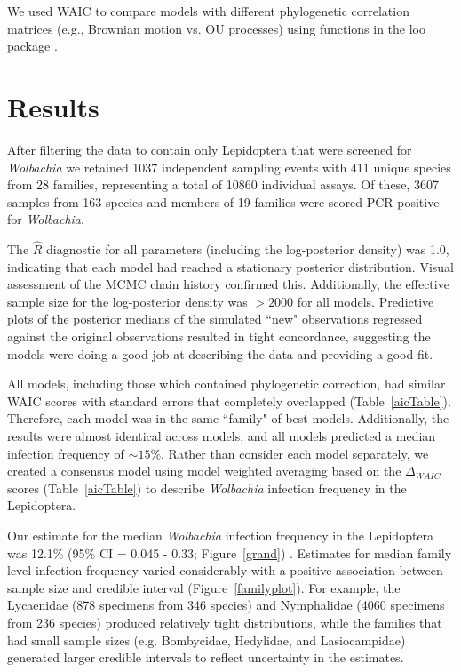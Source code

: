 \documentclass{frontiersSCNS}
\begin{document}
We used WAIC \citep[the widely applicable or Watanabe-Akaike information criterion;][]{Watanabe:2010aa,Gelman:2014aa} to compare models with different phylogenetic correlation matrices (e.g., Brownian motion vs. OU processes) using functions in the loo package \citep{Vehtari:2016aa}. 

\section{Results}
After filtering the \citet{Weinert:2015aa} data to contain only Lepidoptera that were screened for \textit{Wolbachia} we retained 1037 independent sampling events with 411 unique species from 28 families, representing a total of 10860 individual assays. Of these, 3607 samples from 163 species and members of 19 families were scored PCR positive for \textit{Wolbachia}. 

The $\hat{R}$ diagnostic for all parameters (including the log-posterior density) was 1.0, indicating that each model had reached a stationary posterior distribution. Visual assessment of the MCMC chain history confirmed this. Additionally, the effective sample size for the log-posterior density was $> 2000$ for all models. Predictive plots of the posterior medians of the simulated ``new" observations regressed against the original observations resulted in tight concordance, suggesting the models were doing a good job at describing the data and providing a good fit. %

All models, including those which contained phylogenetic correction, had similar WAIC scores with standard errors that completely overlapped (Table~\ref{aicTable}).  Therefore, each model was in the same ``family" of best models. Additionally, the results were almost identical across models, and all models predicted a median infection frequency of $\sim 15\%$. Rather than consider each model separately, we created a consensus model using model weighted averaging based on the $\Delta_{WAIC}$ scores (Table~\ref{aicTable}) to describe \emph{Wolbachia} infection frequency in the Lepidoptera. 

Our estimate for the median \emph{Wolbachia} infection frequency in the Lepidoptera was 12.1\% (95\% CI = 0.045 - 0.33; Figure~\ref{grand}) . Estimates for median family level infection frequency varied considerably with a positive association between sample size and credible interval (Figure~\ref{familyplot}). For example, the Lycaenidae (878 specimens from 346 species) and Nymphalidae (4060 specimens from 236 species) produced relatively tight distributions, while the families that had small sample sizes (e.g. Bombycidae, Hedylidae, and Lasiocampidae) generated larger credible intervals to reflect uncertainty in the estimates. 
\end{document}
